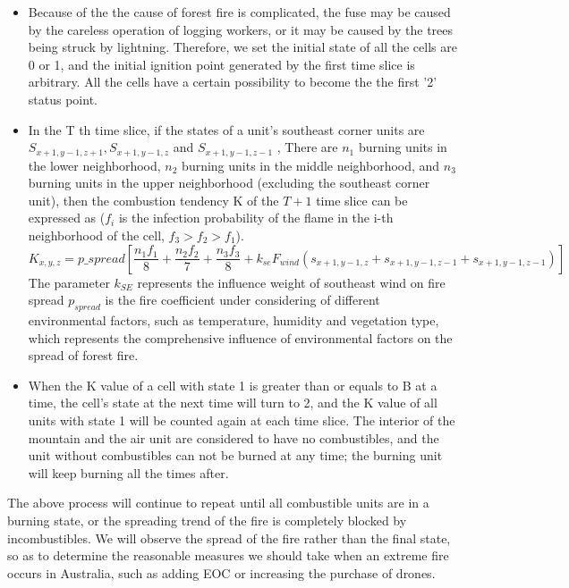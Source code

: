 \documentclass{mcmthesis}
\begin{document}
\begin{itemize}
  \item Because of the the cause of forest fire is complicated, the fuse may be caused by the careless operation of logging workers, or it may be caused by the trees being struck by lightning. Therefore, we set the initial state of all the cells are 0 or 1, and the initial ignition point generated by the first time slice is arbitrary. All the cells have a certain possibility to become the the first '2' status point.
  \item In the T th time slice, if the states of a unit's southeast corner units are 
  $S_{x+1,y-1,z+1},S_{x+1,y-1,z}$ and $S_{x+1,y-1,z-1}$ 
  , There are $n_1$ burning units in the lower neighborhood, $n_2$ burning units in the middle neighborhood, and $n_3$ burning units in the upper neighborhood (excluding the southeast corner unit), then the combustion tendency K of the $T + 1$ time slice can be expressed as ($f_i$ is the infection probability of the flame in the i-th neighborhood of the cell, $f_3>f_2>f_1$).
  \begin{equation}
    K_{x,y,z}=p\_spread\left [ \frac{n_1f_1}{8}+\frac{n_2f_2}{7}+\frac{n_3f_3}{8}+k_{se}F_{wind}(s_{x+1,y-1,z}+s_{x+1,y-1,z-1}+s_{x+1,y-1,z-1})  \right ] 
  \end{equation}
  The parameter $k_{SE}$ represents the influence weight of southeast wind on fire spread
$p_ {spread}$ is the fire coefficient under considering of different environmental factors, such as temperature, humidity and vegetation type, which represents the comprehensive influence of environmental factors on the spread of forest fire.
  \item When the K value of a cell with state 1 is greater than or equals to B at a time, the cell's state at the next time will turn to 2, and the K value of all units with state 1 will be counted again at each time slice. The interior of the mountain and the air unit are considered to have no combustibles, and the unit without combustibles can not be burned at any time; the burning unit will keep burning all the times after.

\end{itemize}

The above process will continue to repeat until all combustible units are in a burning state, or the spreading trend of the fire is completely blocked by incombustibles. We will observe the spread of the fire rather than the final state, so as to determine the reasonable measures we should take when an extreme fire occurs in Australia, such as adding EOC or increasing the purchase of drones.
\end{document}
